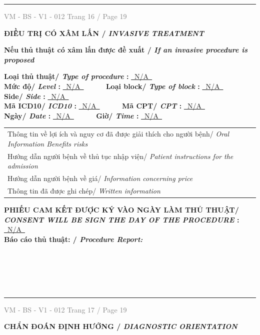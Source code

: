 \documentclass[11pt,a4paper]{article}
\newcommand{\CheckBox}[2][false]{%
    \ifthenelse{\equal{#1}{true}}{%
        \makebox[0pt][l]{$\square$}\raisebox{.15ex}{\hspace{0.08em}$\checkmark$}%
    }{%
        $\square$%
    }%
    \hspace{0.12cm}#2%
}
\newcommand{\SectionTitle}[2]{%
    \vspace{0.12cm}
    {\bfseries\large #1/ \textit{#2}}\par
    \vspace{0.06cm}
}
\newcommand{\SubSectionTitle}[2]{%
    \vspace{0.08cm}
    {\bfseries #1/ \textit{#2}}\par
}
\newcommand{\FormFooter}[2]{%
    \vfill
    \hrule
    \vspace{0.08cm}
    \noindent
    \small \textcolor{gray}{VM - BS - V1 - 012} \hfill \small \textcolor{gray}{Trang #1 / Page #2}
}
\begin{document}
\FormFooter{ 16 }{ 19 }
\newpage

\SectionTitle{ ĐIỀU TRỊ CÓ XÂM LẤN }{ INVASIVE TREATMENT }

\SubSectionTitle{ Nếu thủ thuật có xâm lấn được đề xuất }{ If an invasive procedure is proposed }

\textbf{ Loại thủ thuật/ \textit{ Type of procedure }: } \underline{~N/A~}\\[0.12cm]
\textbf{ Mức độ/ \textit{ Level }: } \underline{~N/A~} ~~~~~ \textbf{ Loại block/ \textit{ Type of block }: } \underline{~N/A~} ~~~~~ \textbf{ Side/ \textit{ Side }: } \underline{~N/A~}\\[0.12cm]
\textbf{ Mã ICD10/ \textit{ ICD10 }: } \underline{~N/A~} ~~~~~ \textbf{ Mã CPT/ \textit{ CPT }: } \underline{~N/A~}\\[0.12cm]
\textbf{ Ngày/ \textit{ Date }: } \underline{~N/A~} ~~~~~ \textbf{ Giờ/ \textit{ Time }: } \underline{~N/A~}\\[0.12cm]

\begin{tabularx}{\textwidth}{@{} X @{}}
    \CheckBox[false]{ Thông tin về lợi ích và nguy cơ đã được giải thích cho người bệnh/ \textit{ Oral Information Benefits risks } }   \\[0.12cm]
    \CheckBox[false]{ Hướng dẫn người bệnh về thủ tục nhập viện/ \textit{ Patient instructions for the admission } }   \\[0.12cm]
    \CheckBox[false]{ Hướng dẫn người bệnh về giá/ \textit{ Information concerning price } }   \\[0.12cm]
    \CheckBox[false]{ Thông tin đã được ghi chép/ \textit{ Written information } }   \\[0.12cm]
\end{tabularx}
\textbf{ PHIẾU CAM KẾT ĐƯỢC KÝ VÀO NGÀY LÀM THỦ THUẬT/ \textit{ CONSENT WILL BE SIGN THE DAY OF THE PROCEDURE }: } \underline{~N/A~}\\[0.12cm]

\SectionTitle{ Báo cáo thủ thuật: }{ Procedure Report: }

\noindent\dotfill\\[0.35cm]
\noindent\dotfill\\[0.35cm]
\noindent\dotfill\\[0.35cm]
\noindent\dotfill\\[0.35cm]


\FormFooter{ 17 }{ 19 }
\newpage

\SectionTitle{ CHẨN ĐOÁN ĐỊNH HƯỚNG }{ DIAGNOSTIC ORIENTATION }
\end{document}
